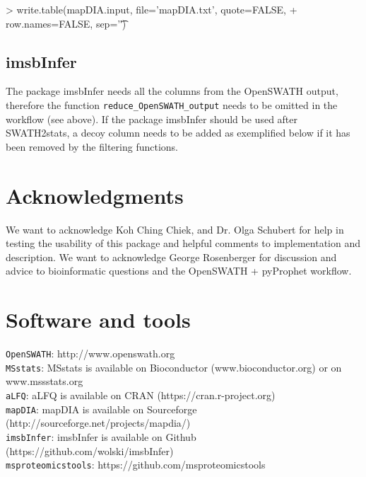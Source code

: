 \documentclass[a4paper]{article}
\begin{document}
\begin{Schunk}
\begin{Sinput}
> write.table(mapDIA.input, file='mapDIA.txt', quote=FALSE,
+           row.names=FALSE, sep='\t')
\end{Sinput}
\end{Schunk}


\subsection{imsbInfer}
The package imsbInfer needs all the columns from the OpenSWATH output, therefore the function \texttt{reduce\_OpenSWATH\_output} needs to be omitted in the workflow (see above). If the package imsbInfer should be used after SWATH2stats, a decoy column needs to be added as exemplified below if it has been removed by the filtering functions.

\begin{Schunk}
\end{Schunk}

\section{Acknowledgments}
We want to acknowledge Koh  Ching Chiek, and Dr. Olga Schubert for help in testing the usability of this package and helpful comments to implementation and description. We want to acknowledge George Rosenberger for discussion and advice to bioinformatic questions and the OpenSWATH + pyProphet workflow.

\section{Software and tools}
\texttt{OpenSWATH}: http://www.openswath.org\\
\texttt{MSstats}: MSstats is available on Bioconductor (www.bioconductor.org) or on www.mssstats.org\\
\texttt{aLFQ}: aLFQ is available on CRAN (https://cran.r-project.org)\\
\texttt{mapDIA}: mapDIA is available on Sourceforge (http://sourceforge.net/projects/mapdia/)\\
\texttt{imsbInfer}: imsbInfer is available on Github (https://github.com/wolski/imsbInfer)\\
\texttt{msproteomicstools}: https://github.com/msproteomicstools\\
\end{document}
